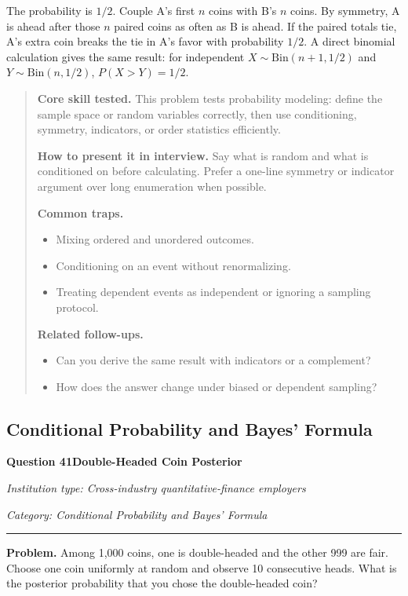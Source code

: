 \documentclass[11pt,letterpaper,openany]{book}
\newenvironment{EditorialNote}
  {\begin{quote}\small\setlength{\parskip}{0.25em}}
  {\end{quote}}
\newcommand{\QuestionSpacer}{\vspace{0.4em}}
\newcommand{\FoundationQuestionHeader}[3]{%
  \vspace{1.0em}%
  {\large\bfseries #1\enspace #2\par}%
  {\small\itshape Institution type: Cross-industry quantitative-finance employers\par}%
  {\small\itshape Category: #3\par}%
  \vspace{0.25em}\hrule\vspace{0.45em}%
}
\begin{document}
The probability is \(\boxed{1/2}\). Couple A's first \(n\) coins with B's \(n\) coins. By symmetry, A is ahead after those \(n\) paired coins as often as B is ahead. If the paired totals tie, A's extra coin breaks the tie in A's favor with probability \(1/2\). A direct binomial calculation gives the same result: for independent \(X\sim\mathrm{Bin}(n+1,1/2)\) and \(Y\sim\mathrm{Bin}(n,1/2)\), \(P(X>Y)=1/2\).


\begin{EditorialNote}


\textbf{Core skill tested.} This problem tests probability modeling: define the sample space or random variables correctly, then use conditioning, symmetry, indicators, or order statistics efficiently.


\textbf{How to present it in interview.} Say what is random and what is conditioned on before calculating. Prefer a one-line symmetry or indicator argument over long enumeration when possible.


\textbf{Common traps.}
\begin{itemize}
\item Mixing ordered and unordered outcomes.
\item Conditioning on an event without renormalizing.
\item Treating dependent events as independent or ignoring a sampling protocol.
\end{itemize}


\textbf{Related follow-ups.}
\begin{itemize}
\item Can you derive the same result with indicators or a complement?
\item How does the answer change under biased or dependent sampling?
\end{itemize}


\end{EditorialNote}
\QuestionSpacer

\subsection{Conditional Probability and Bayes' Formula}

\FoundationQuestionHeader{Question 41}{Double-Headed Coin Posterior}{Conditional Probability and Bayes' Formula}

\textbf{Problem.} Among 1,000 coins, one is double-headed and the other 999 are fair. Choose one coin uniformly at random and observe 10 consecutive heads. What is the posterior probability that you chose the double-headed coin?
\end{document}
